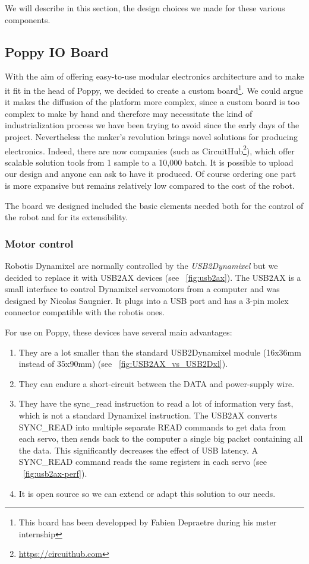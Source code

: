 We will describe in this section, the design choices we made for these various components.

\subsection{Poppy IO Board} %

With the aim of offering easy-to-use modular electronics architecture and to make it fit in the head of Poppy, we decided to create a custom board\footnote{This board has been developped by Fabien Depraetre during his mster internship}. We could argue it makes the diffusion of the platform more complex, since a custom board is too complex to make by hand and therefore may necessitate the kind of industrialization process we have been trying to avoid since the early days of the project. Nevertheless the maker’s revolution brings novel solutions for producing electronics. Indeed, there are now companies (such as CircuitHub\footnote{\url{https://circuithub.com}}), which offer scalable solution tools from 1 sample to a 10,000 batch. It is possible to upload our design and anyone can ask to have it produced. Of course ordering one part is more expansive but remains relatively low compared to the cost of the robot.

The board we designed included the basic elements needed both for the control of the robot and for its extensibility.


\subsubsection{Motor control} %
Robotis Dynamixel are normally controlled by the \emph{USB2Dynamixel} but we decided to replace it with USB2AX devices (see \figurename~\ref{fig:usb2ax}). The USB2AX is a small interface to control Dynamixel servomotors from a computer and was designed by Nicolas Saugnier. It plugs into a USB port and has a 3-pin molex connector compatible with the robotis ones.

For use on Poppy, these devices have several main advantages:
\begin{enumerate}
    \item They are a lot smaller than the standard USB2Dynamixel module (16x36mm instead of 35x90mm) (see \figurename~\ref{fig:USB2AX_vs_USB2Dxl}).
    \item They can endure a short-circuit between the DATA and power-supply wire.
    \item They have the sync\_read instruction to read a lot of information very fast, which is not a standard Dynamixel instruction. The USB2AX converts SYNC\_READ into multiple separate READ commands to get data from each servo, then sends back to the computer a single big packet containing all the data. This significantly decreases the effect of USB latency. A SYNC\_READ command reads the same registers in each servo (see \figurename~\ref{fig:usb2ax-perf}).
    \item It is open source so we can extend or adapt this solution to our needs.
\end{enumerate}

